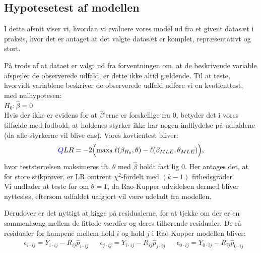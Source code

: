 \documentclass[11pt,a4paper]{article}
\begin{document}
\subsection{Hypotesetest af modellen}
I dette afsnit viser vi, hvordan vi evaluere vores model ud fra et givent datasæt i praksis, hvor det er antaget at det valgte datasæt er komplet, repræsentativt og stort. \par
På trods af at dataet er valgt ud fra forventningen om, at de beskrivende variable afspejler de observerede udfald, er dette ikke altid gældende. Til at teste, hvorvidt variablene beskriver de observerede udfald udføre vi en kvotienttest, med nulhypotesen:\\
$H_0: \hat{\beta} = 0$\\
Hvis der ikke er evidens for at $\hat{\beta}$'erne er forskellige fra 0, betyder det i vores tilfælde med fodbold, at holdenes styrker ikke har nogen indflydelse på udfaldene (da alle styrkerne vil blive ens). Vores kovtientest bliver:
\begin{align*}
\textcolor{blue}{Q} LR = -2\Big{(}\text{max}_\theta \;\ell (\beta_{H_0},\theta)-\ell (\beta_{MLE},\theta_{MLE})\Big{)},
\end{align*}
hvor teststørrelsen maksimeres ift. $\theta$ med $\hat{\beta}$ holdt fast lig 0. Her antages det, at for store stikprøver, er LR omtrent $\chi^2$-fordelt med $(k-1)$ frihedsgrader. \\
Vi undlader at teste for om $\theta=1$, da Rao-Kupper udvidelsen dermed bliver nyttesløs, eftersom udfaldet uafgjort vil være udeladt fra modellen. \par
Derudover er det nyttigt at kigge på residualerne, for at tjekke om der er en sammenhæng mellem de fittede værdier og deres tilhørende residualer. De rå residualer for kampene mellem hold $i$ og hold $j$ i Rao-Kupper modellen bliver:
\begin{align*}
&\epsilon_{i\cdot ij}=Y_{i\cdot ij}-R_{ij}\hat{p}_{i\cdot ij}
&&\epsilon_{j\cdot ij}=Y_{i\cdot ij}-R_{ij} \hat{p}_{j\cdot ij}
&&\epsilon_{0\cdot ij}=Y_{0\cdot ij}-R_{ij} \hat{p}_{0\cdot ij}
\end{align*}
\end{document}
